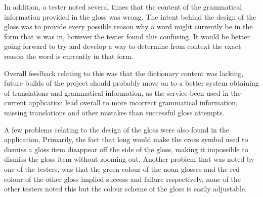 In addition, a tester noted several times that the content of the grammatical information provided in the gloss was wrong. The intent behind the design of the gloss was to provide every possible reason why a word might currently be in the form that is was in, however the tester found this confusing. It would be better going forward to try and develop a way to determine from context the exact reason the word is currently in that form. 

Overall feedback relating to this was that the dictionary content was lacking, future builds of the project should probably move on to a better system obtaining of translations and grammatical information, as the service been used in the current application lead overall to more incorrect grammatical information, missing translations and other mistakes than successful gloss attempts. 

A few problems relating to the design of the gloss were also found in the application, Primarily, the fact that long would make the cross symbol used to dismiss a gloss item disappear off the side of the gloss, making it impossible to dismiss the gloss item without zooming out. Another problem that was noted by one of the testers, was that the green colour of the noun glosses and the red colour of the other gloss implied success and failure respectively, none of the other testers noted this but the colour scheme of the gloss is easily adjustable.


